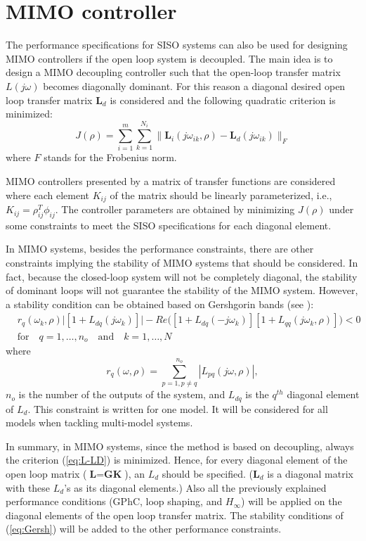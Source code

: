 \documentclass [12pt , a4paper] {report}
\begin{document}
\section{MIMO controller}
The performance specifications for SISO systems can also be used for designing MIMO controllers if the open loop system is decoupled. The main idea is to design a MIMO decoupling controller such that the open-loop transfer matrix $L(j\omega)$ becomes diagonally dominant. For this reason a diagonal desired open loop transfer matrix $\textbf{L}_d$ is considered and the following quadratic criterion is minimized:
\begin{equation}
\label{eq:L-LD}
J(\rho)=\sum_{i=1}^{m}\sum_{k=1}^{N_i} \| \textbf{L}_i(j\omega_{ik},\rho)- \textbf{L}_d(j\omega_{ik}) \|_F
\end{equation}
where $F$ stands for the Frobenius norm.

MIMO controllers presented by a matrix of transfer functions are considered where each element $K_{ij}$ of the matrix should be linearly parameterized, i.e., $K_{ij}=\rho_{ij}^T\phi_{ij}$. The controller parameters are obtained by minimizing $J(\rho)$ under some constraints to meet the SISO specifications for each diagonal element. 

In MIMO systems, besides the performance constraints, there are other constraints implying the stability of MIMO systems that should be considered. In fact, because the closed-loop system will not be completely diagonal, the stability of dominant loops will not guarantee the stability of the MIMO system. However, a stability condition can be obtained based on Gershgorin bands (see \cite{GKL10b}):
\begin{align}
\label{eq:Gersh}
& r_q(\omega_k,\rho)\big| [1+L_{dq}(j\omega_k)]\big|-Re\big([1+L_{dq}(-j\omega_k)][1+L_{qq}(j\omega_k,\rho)]\big)<0 \nonumber \\
& \mbox{for} \quad q=1,\ldots,n_o \quad  \mbox{and} \quad k=1,\ldots,N 
\end{align}
where
\[
r_q(\omega,\rho)=\sum_{p=1,p\neq q}^{n_o} |L_{pq}(j\omega,\rho)|,
\]
$n_o$ is the number of the outputs of the system, and $L_{dq}$ is the $q^{th}$ diagonal element of $L_d$. This constraint is written for one model. It will be considered for all models when tackling multi-model systems.

In summary, in MIMO systems, since the method is based on decoupling, always the criterion (\ref{eq:L-LD}) is minimized. Hence, for every diagonal element of the open loop matrix ($\textbf{L}=\textbf{GK}$), an $L_d$ should be specified. ($\textbf{L}_d$ is a diagonal matrix with these $L_d$'s as its diagonal elements.) Also all the previously explained performance conditions (GPhC, loop shaping, and $H_\infty$) will be applied on the diagonal elements of the open loop transfer matrix. The stability conditions of (\ref{eq:Gersh}) will be added to the other performance constraints. 
\end{document}
